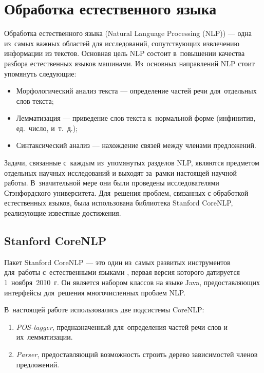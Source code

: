 \section{Обработка естественного языка}

Обработка естественного языка (Natural Language Processing (NLP))\cite{textminingsurvey} --- 
одна из~самых важных областей для исследований, сопутствующих извлечению информации из текстов.
Основная цель NLP состоит в~повышении качества разбора естественных языков машинами.
Из~основных направлений NLP стоит упомянуть следующие:

\begin{itemize}

\item {Морфологический анализ текста --- определение частей речи для~отдельных слов текста;}
\item {Лемматизация --- приведение слов текста к~нормальной форме (инфинитив, ед.~число, и~т.~д.);}
\item {Синтаксический анализ --- нахождение связей между членами предложений.}

\end{itemize}

Задачи, связанные с~каждым из~упомянутых разделов NLP, 
являются предметом отдельных научных исследований и выходят за~рамки настоящей научной работы.
В~значительной мере они были проведены исследователями Стэнфордского университета. 
Для~решения проблем, связанных с обработкой естественных языков, была использована библиотека  Stanford CoreNLP,
реализующие известные достижения.

\subsection{Stanford CoreNLP}
\label{st_corenlp}

Пакет Stanford CoreNLP --- это один из~самых развитых инструментов для~работы с~естественными языками \cite{corenlp}, 
первая версия которого датируется 1~ноября~2010~г.
Он является набором классов на языке Java, предоставляющих интерфейсы для~решения многочисленных проблем NLP. 

В~настоящей работе использовались две подсистемы CoreNLP:

\begin{enumerate}

\item {{\it POS-tagger}, предназначенный для~определения частей речи слов и их~лемматизации.}
\item {{\it Parser}, предоставляющий возможность строить дерево зависимостей членов предложений.}

\end{enumerate}

